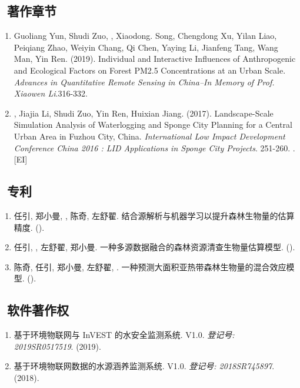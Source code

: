 \subsection*{\texorpdfstring{\faBook\ 著作章节}{著作章节}}
\begin{enumerate}
\item
    Guoliang Yun, Shudi Zuo, \Shaoqing, Xiaodong. Song, Chengdong Xu, Yilan Liao, Peiqiang Zhao, Weiyin Chang, Qi Chen, Yaying Li, Jianfeng Tang, Wang Man, Yin Ren. (2019).
	Individual and Interactive Influences of Anthropogenic and Ecological Factors on Forest PM2.5 Concentrations at an Urban Scale.
    \textit{Advances in Quantitative Remote Sensing in China–In Memory of Prof. Xiaowen Li}.316-332.
\item
    \Shaoqing, Jiajia Li, Shudi Zuo, Yin Ren, Huixian Jiang. (2017).
	Landscape-Scale Simulation Analysis of Waterlogging and Sponge City Planning for a Central Urban Area in Fuzhou City, China.
    \textit{International Low Impact Development Conference China 2016 : LID Applications in Sponge City Projects}. 251-260.
    . [EI]
\end{enumerate}

\subsection*{\texorpdfstring{\faBook\ 专利}{专利}}
\begin{enumerate}
\item
     任引, 郑小曼, {}, 陈奇, 左舒翟.
     结合源解析与机器学习以提升森林生物量的估算精度.
     ({}).
\item
     任引, {}, 左舒翟, 郑小曼.
     一种多源数据融合的森林资源清查生物量估算模型.
     ({}).
\item
     陈奇, 任引, 郑小曼, 左舒翟, {}.
     一种预测大面积亚热带森林生物量的混合效应模型.
     ({}).
\end{enumerate}

\subsection*{\texorpdfstring{\faBook\ 软件著作权}{软件著作权}}
\begin{enumerate}
\item
   基于环境物联网与 InVEST 的水安全监测系统. V1.0.
    \textit{登记号: 2019SR0517519}. (2019).
\item
    基于环境物联网数据的水源涵养监测系统. V1.0.
    \textit{登记号: 2018SR745897}. (2018).
\end{enumerate}

